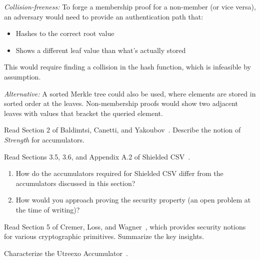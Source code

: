 \begin{mysolution}
  \emph{Collision-freeness:} To forge a membership proof for a non-member (or vice versa), an adversary would need to provide an authentication path that:
  \begin{itemize}
    \item Hashes to the correct root value
    \item Shows a different leaf value than what's actually stored
  \end{itemize}
  This would require finding a collision in the hash function, which is infeasible by assumption.
  
  \emph{Alternative:} A sorted Merkle tree could also be used, where elements are stored in sorted order at the leaves.
  Non-membership proofs would show two adjacent leaves with values that bracket the queried element.
\end{mysolution}
\fi

\begin{exercise}[Optional]
  Read Section 2 of Baldimtsi, Canetti, and Yakoubov~\cite{RSA:BalCanYak20}.
  Describe the notion of \emph{Strength} for accumulators.
\end{exercise}

\begin{exercise}[Optional]
  Read Sections 3.5, 3.6, and Appendix A.2 of Shielded CSV~\cite{nick2025shielded}.
  \begin{enumerate}
    \item How do the accumulators required for Shielded CSV differ from the accumulators discussed in this section?
    \item How would you approach proving the  security property (an open problem at the time of writing)?
  \end{enumerate}
\end{exercise}

\begin{exercise}[Optional]
  Read Section 5 of Cremer, Loss, and Wagner~\cite{EC:CreLosWag24}, which provides security notions for various cryptographic primitives.
  Summarize the key insights.
\end{exercise}

\begin{exercise}[Optional]
  Characterize the Utreexo Accumulator~\cite{add:bip-utreexo}.
\end{exercise}


